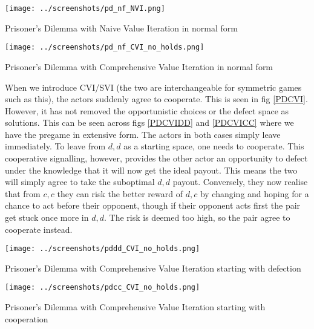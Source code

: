 \begin{fig}[H]
  \begin{minipage}[b]{1.0\linewidth}
    \centering
    \centerline{\texttt{[image: ../screenshots/pd\_nf\_NVI.png]}}
    \caption{Prisoner's Dilemma with Naive Value Iteration in normal form}\medskip\label{PDNVI}
  \end{minipage}
\end{fig}

\begin{fig}[H]
  \begin{minipage}[b]{1.0\linewidth}
    \centering
    \centerline{\texttt{[image: ../screenshots/pd\_nf\_CVI\_no\_holds.png]}}
    \caption{Prisoner's Dilemma with Comprehensive Value Iteration in normal form}\medskip\label{PDCVI}
  \end{minipage}
\end{fig}

When we introduce CVI/SVI (the two are interchangeable for symmetric games such as this), the actors suddenly agree to cooperate. This is seen in fig \ref{PDCVI}. However, it has not removed the opportunistic choices or the defect space as solutions. This can be seen across figs \ref{PDCVIDD} and \ref{PDCVICC} where we have the pregame in extensive form. The actors in both cases simply leave immediately. To leave from $d,d$ as a starting space, one needs to cooperate. This cooperative signalling, however, provides the other actor an opportunity to defect under the knowledge that it will now get the ideal payout. This means the two will simply agree to take the suboptimal $d,d$ payout. Conversely, they now realise that from $c,c$ they can risk the better reward of $d,c$ by changing and hoping for a chance to act before their opponent, though if their opponent acts first the pair get stuck once more in $d,d$. The risk is deemed too high, so the pair agree to cooperate instead.

\begin{fig}[H]
  \begin{minipage}[b]{1.0\linewidth}
    \centering
    \centerline{\texttt{[image: ../screenshots/pddd\_CVI\_no\_holds.png]}}
    \caption{Prisoner's Dilemma with Comprehensive Value Iteration starting with defection}\medskip\label{PDCVIDD}
  \end{minipage}
\end{fig}

\begin{fig}[H]
  \begin{minipage}[b]{1.0\linewidth}
    \centering
    \centerline{\texttt{[image: ../screenshots/pdcc\_CVI\_no\_holds.png]}}
    \caption{Prisoner's Dilemma with Comprehensive Value Iteration starting with cooperation}\medskip\label{PDCVICC}
  \end{minipage}
\end{fig}


